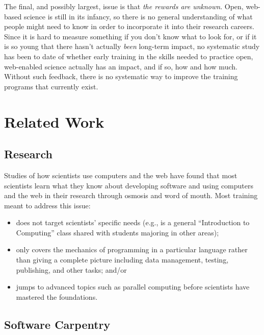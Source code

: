 \documentclass[11pt]{article}
\begin{document}
The final, and possibly largest, issue is that \emph{the rewards are
  unknown}.  Open, web-based science is still in its infancy, so there
is no general understanding of what people might need to know in order
to incorporate it into their research careers.  Since it is hard to
measure something if you don't know what to look for, or if it is so
young that there hasn't actually \emph{been} long-term impact, no
systematic study has been to date of whether early training in the
skills needed to practice open, web-enabled science actually has an
impact, and if so, how and how much.  Without such feedback, there is
no systematic way to improve the training programs that currently
exist.

\section{Related Work}

\subsection{Research}

Studies of how scientists use computers and the web have found that
most scientists learn what they know about developing software and
using computers and the web in their research through osmosis and word
of mouth. Most training meant to address this issue:

\begin{itemize}

\item
  does not target scientists' specific needs (e.g., is a general
  ``Introduction to Computing'' class shared with students majoring in
  other areas);

\item
  only covers the mechanics of programming in a particular language
  rather than giving a complete picture including data management,
  testing, publishing, and other tasks; and/or

\item
  jumps to advanced topics such as parallel computing before
  scientists have mastered the foundations.

\end{itemize}

\subsection{Software Carpentry}
\end{document}
